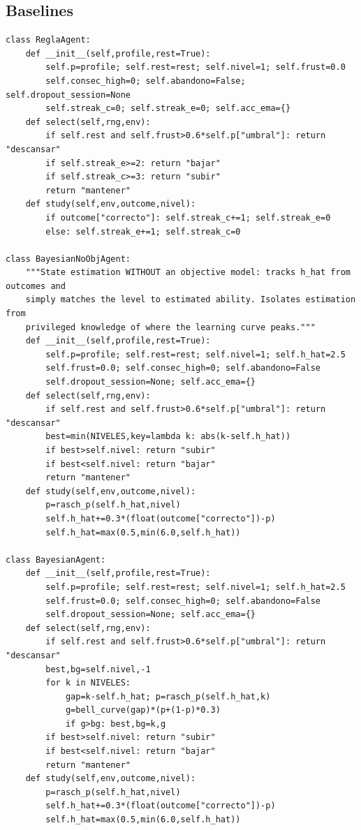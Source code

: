 \documentclass{article}
\begin{document}
\subsection{Baselines}
\begin{verbatim}
class ReglaAgent:
    def __init__(self,profile,rest=True):
        self.p=profile; self.rest=rest; self.nivel=1; self.frust=0.0
        self.consec_high=0; self.abandono=False; self.dropout_session=None
        self.streak_c=0; self.streak_e=0; self.acc_ema={}
    def select(self,rng,env):
        if self.rest and self.frust>0.6*self.p["umbral"]: return "descansar"
        if self.streak_e>=2: return "bajar"
        if self.streak_c>=3: return "subir"
        return "mantener"
    def study(self,env,outcome,nivel):
        if outcome["correcto"]: self.streak_c+=1; self.streak_e=0
        else: self.streak_e+=1; self.streak_c=0

class BayesianNoObjAgent:
    """State estimation WITHOUT an objective model: tracks h_hat from outcomes and
    simply matches the level to estimated ability. Isolates estimation from
    privileged knowledge of where the learning curve peaks."""
    def __init__(self,profile,rest=True):
        self.p=profile; self.rest=rest; self.nivel=1; self.h_hat=2.5
        self.frust=0.0; self.consec_high=0; self.abandono=False
        self.dropout_session=None; self.acc_ema={}
    def select(self,rng,env):
        if self.rest and self.frust>0.6*self.p["umbral"]: return "descansar"
        best=min(NIVELES,key=lambda k: abs(k-self.h_hat))
        if best>self.nivel: return "subir"
        if best<self.nivel: return "bajar"
        return "mantener"
    def study(self,env,outcome,nivel):
        p=rasch_p(self.h_hat,nivel)
        self.h_hat+=0.3*(float(outcome["correcto"])-p)
        self.h_hat=max(0.5,min(6.0,self.h_hat))

class BayesianAgent:
    def __init__(self,profile,rest=True):
        self.p=profile; self.rest=rest; self.nivel=1; self.h_hat=2.5
        self.frust=0.0; self.consec_high=0; self.abandono=False
        self.dropout_session=None; self.acc_ema={}
    def select(self,rng,env):
        if self.rest and self.frust>0.6*self.p["umbral"]: return "descansar"
        best,bg=self.nivel,-1
        for k in NIVELES:
            gap=k-self.h_hat; p=rasch_p(self.h_hat,k)
            g=bell_curve(gap)*(p+(1-p)*0.3)
            if g>bg: best,bg=k,g
        if best>self.nivel: return "subir"
        if best<self.nivel: return "bajar"
        return "mantener"
    def study(self,env,outcome,nivel):
        p=rasch_p(self.h_hat,nivel)
        self.h_hat+=0.3*(float(outcome["correcto"])-p)
        self.h_hat=max(0.5,min(6.0,self.h_hat))


\end{verbatim}
\end{document}
